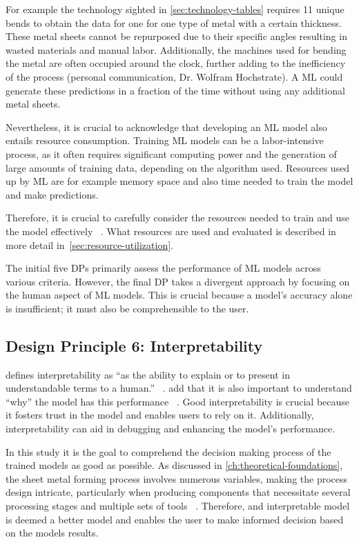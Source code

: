 {For example the technology sighted in \cref{sec:technology-tables} requires 11 unique bends to obtain the data
for one for one type of metal with a certain thickness.
These metal sheets cannot be repurposed due to their specific angles resulting in wasted materials and manual labor.
Additionally, the machines used for bending the metal are often occupied around the clock, further adding to the
inefficiency of the process (personal communication, Dr. Wolfram Hochstrate).
A \ac{ML} could generate these predictions in a fraction of the time without using any additional metal sheets.

Nevertheless, it is crucial to acknowledge that developing an \ac{ML} model also entails resource consumption.
Training \ac{ML} models can be a labor-intensive process, as it often requires significant
computing power and the generation of large amounts of training data, depending on the algorithm used.
Resources used up by \ac{ML} are for example memory space and also time needed to train the model and make predictions.

Therefore, it is crucial to carefully consider the resources needed to train and use the model
effectively
~\cite[p. 16]{siebert2022construction}.
What resources are used and evaluated is described in more detail in~\ref{sec:resource-utilization}.

The initial five \ac{DP}s primarily assess the performance of \ac{ML} models across various criteria.
However, the final \ac{DP} takes a divergent approach by focusing on the human aspect of \ac{ML} models.
This is crucial because a model's accuracy alone is insufficient; it must also be comprehensible to the user.


\subsection*{Design Principle 6: Interpretability}
\cite{doshi2017towards} defines interpretability as ``as the ability to explain or to present in understandable
terms to a human.''
~\cite[p. w]{doshi2017towards}.
\cite{miller2019explanation} add that it is also important to understand ``why'' the model has this performance
~\cite[p. 1]{miller2019explanation}.
Good interpretability is crucial because it fosters trust in the model and enables users to rely on it.
Additionally, interpretability can aid in debugging and enhancing the model's performance.

In this study it is the goal to comprehend the decision making process of the trained models as good as possible.
As discussed in \cref{ch:theoretical-foundations}, the sheet metal forming process involves numerous
variables, making the process design intricate, particularly when producing components that necessitate several
processing stages and multiple sets of tools
~\cite[p. 1]{dib_singleensembleclassifiers_2020}.
Therefore,  and interpretable model is deemed a better model and enables the user to make informed decision based
on the models results.


}
